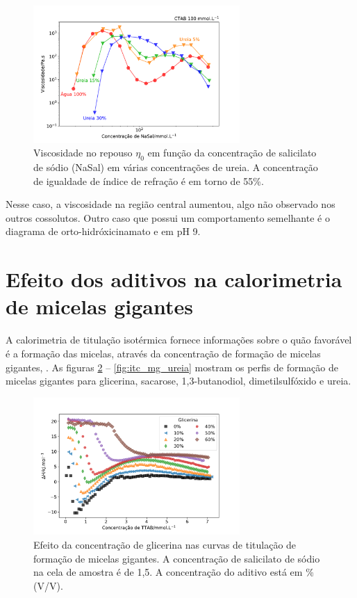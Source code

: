 			\begin{figure}[h]
				\centering
				\includegraphics[width=0.7\textwidth]{imagens/reologia/RH_ureia}
				\caption{Viscosidade no repouso \(\eta_0\) em função da concentração de salicilato de sódio (NaSal) em várias concentrações de ureia. A concentração de igualdade de índice de refração é em torno de 55\%.}
				\label{fig:rh_ureia}
			\end{figure}

			Nesse caso, a viscosidade na região central aumentou, algo não observado nos outros cossolutos. Outro caso que possui um comportamento semelhante é o diagrama de orto-hidróxicinamato e \CTAB{} em pH 9. %
		
		\FloatBarrier
		
		\section{Efeito dos aditivos na calorimetria de micelas gigantes}
		
			A calorimetria de titulação isotérmica fornece informações sobre o quão favorável é a formação das micelas, através da concentração de formação de micelas gigantes, \cwlm. As figuras \ref{fig:itc_mg_glicerina} -- \ref{fig:itc_mg_ureia} mostram os perfis de formação de micelas gigantes para glicerina, sacarose, 1,3-butanodiol, dimetilsulfóxido e ureia.
		
			\begin{figure}[h]
				\centering
				\includegraphics[width=0.7\textwidth]{imagens/itc/ITC_MG_glic}
				\caption{Efeito da concentração de glicerina nas curvas de titulação de formação de micelas gigantes. A concentração de salicilato de sódio na cela de amostra é de 1,5\mM. A concentração do aditivo está em \% (V/V).}
				\label{fig:itc_mg_glicerina}
			\end{figure}  %
			
